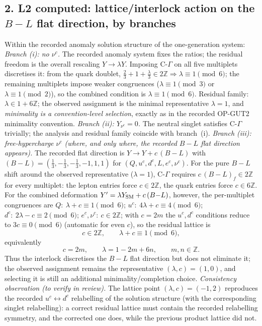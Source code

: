 \subsection*{2. L2 computed: lattice/interlock action on the
$B{-}L$ flat direction, by branches}
Within the recorded anomaly solution structure of the
one-generation system:
\emph{Branch (i): no $\nu^c$.}
The recorded anomaly system fixes the ratios; the residual
freedom is the overall rescaling $Y\to\lambda Y$.
Imposing C-$\Gamma$ on all five multiplets discretises it:
from the quark doublet,
$\tfrac23+1+\tfrac\lambda3\in2\mathbb Z\Rightarrow
\lambda\equiv1\pmod 6$; the remaining multiplets impose weaker
congruences ($\lambda\equiv1\pmod3$ or $\lambda\equiv1\pmod2$),
so the combined condition is $\lambda\equiv1\pmod 6$.
Residual family: $\lambda\in1+6\mathbb Z$; the observed
assignment is the minimal representative $\lambda=1$, and
\emph{minimality is a convention-level selection}, exactly as in
the recorded OP-GUT2 minimality convention.
\emph{Branch (ii): $Y_{\nu^c}=0$.}
The neutral singlet satisfies C-$\Gamma$ trivially; the analysis
and residual family coincide with branch~(i).
\emph{Branch (iii): free-hypercharge $\nu^c$ (where, and only
where, the recorded $B{-}L$ flat direction appears).}
The recorded flat direction is $Y\to Y+c\,(B{-}L)$ with
$(B{-}L)=(\tfrac13,-\tfrac13,-\tfrac13,-1,1,1)$ for
$(Q,u^c,d^c,L,e^c,\nu^c)$.
For the pure $B{-}L$ shift around the observed representative
($\lambda=1$), C-$\Gamma$ requires $c\,(B{-}L)_f\in2\mathbb Z$
for every multiplet: the lepton entries force $c\in2\mathbb Z$,
the quark entries force $c\in6\mathbb Z$.
For the combined deformation
$Y'=\lambda Y_{\rm SM}+c\,(B{-}L)$, however, the per-multiplet
congruences are
$Q:\ \lambda+c\equiv1\pmod6$;
$u^c:\ 4\lambda+c\equiv4\pmod6$;
$d^c:\ 2\lambda-c\equiv2\pmod6$;
$e^c,\nu^c:\ c\in2\mathbb Z$;
with $c=2m$ the $u^c,d^c$ conditions reduce to $3c\equiv0\pmod6$
(automatic for even $c$), so the residual lattice is
\[
  c\in2\mathbb Z,\qquad \lambda+c\equiv1\pmod 6,
\]
equivalently
\[
  c=2m,\qquad \lambda=1-2m+6n,\qquad m,n\in\mathbb Z .
\]
Thus the interlock discretises the $B{-}L$ flat direction but
does not eliminate it; the observed assignment remains the
representative $(\lambda,c)=(1,0)$, and selecting it is still an
additional minimality/completion choice.
\emph{Consistency observation (to verify in review).}
The lattice point $(\lambda,c)=(-1,2)$ reproduces the recorded
$u^c\!\leftrightarrow\!d^c$ relabelling of the solution
structure (with the corresponding singlet relabelling): a correct
residual lattice must contain the recorded relabelling symmetry,
and the corrected one does, while the previous product lattice
did not.

